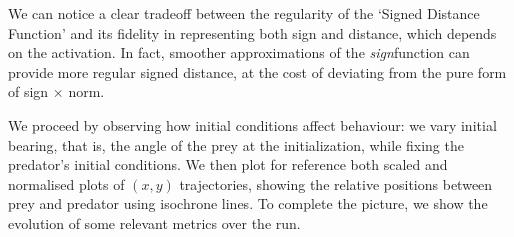 \documentclass[11pt, twocolumn]{article}
\begin{document}
        We can notice a clear tradeoff between the regularity of the `Signed Distance Function' and its fidelity in representing both sign and distance, which depends on the activation. In fact, smoother approximations of the \textit{sign}function can provide more regular signed distance, at the cost of deviating from the pure form of sign $\times$ norm.

        We proceed by observing how initial conditions affect behaviour: we vary initial bearing, that is, the angle of the prey at the initialization, while fixing the predator's initial conditions. We then plot for reference both scaled and normalised plots of $(x,y)$ trajectories, showing the relative positions between prey and predator using isochrone lines. To complete the picture, we show the evolution of some relevant metrics over the run.
\end{document}
